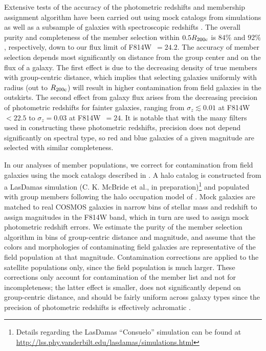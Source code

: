 Extensive tests of the accuracy of the photometric redshifts and
membership assignment algorithm have been carried out using mock
catalogs from simulations as well as a subsample of galaxies with
spectroscopic redshifts \citep{George2011}. The overall purity and
completeness of the member selection within $0.5 R_{\rm 200c}$ is $84\%$
and $92\%$, respectively, down to our
flux limit of F814W~$=24.2$. The
accuracy of member selection depends most significantly on distance
from the group center and on the flux of a galaxy. The first effect is
due to the decreasing density of true members with group-centric
distance, which implies that selecting galaxies uniformly with radius
(out to $R_{\rm 200c}$) will result in higher contamination from field
galaxies in the outskirts. The second effect from galaxy flux arises
from the decreasing precision of photometric redshifts for fainter
galaxies, ranging from $\sigma_z \lesssim 0.01$ at F814W~$< 22.5$ to
$\sigma_z=0.03$ at F814W~$= 24$. It is notable that with the many
filters used in constructing these photometric redshifts, precision
does not depend significantly on spectral type, so red and blue galaxies of a
given magnitude are selected with similar completeness.

In our analyses of member populations, we correct for contamination
from field galaxies using the mock catalogs described in
\citet{George2011}. A halo catalog is constructed from a LasDamas
simulation (C. K. McBride et al., in preparation)\footnote{Details
  regarding the LasDamas ``Consuelo'' simulation can be found at
  \url{http://lss.phy.vanderbilt.edu/lasdamas/simulations.html}} and
populated with group members following the halo occupation model of
\citet{Leauthaud2012}. Mock galaxies are matched to real COSMOS
galaxies in narrow bins of stellar mass and redshift to assign
magnitudes in the F814W band, which in turn are used to assign mock photometric redshift
errors. We estimate the purity of the member selection algorithm in
bins of group-centric distance and magnitude, and assume that the
colors and morphologies of contaminating field galaxies are
representative of the field population at that
magnitude. Contamination corrections are applied to the satellite
populations only, since the field population is much larger. These
corrections only account for contamination of the member list and not
for incompleteness; the latter effect is smaller, does not
significantly depend on group-centric distance, and should be fairly
uniform across galaxy types since the precision of photometric
redshifts is effectively achromatic \citep[see Figures 2 and 5 of][]{George2011}.


